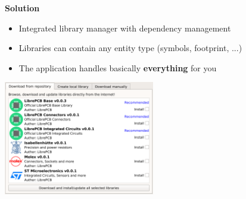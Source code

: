 \begin{frame}[noframenumbering]{\secname}
\begin{center}
  \end{center}
\end{frame}

\begin{frame}[noframenumbering]{\secname}
  \textbf{Solution}
  \begin{itemize}
    \item Integrated library manager with dependency management
    \item Libraries can contain any entity type (symbols, footprint, ...)
    \item The application handles basically \textbf{everything} for you
  \end{itemize}

  \begin{center}
    \includegraphics[height=5cm]{images/library_manager.png}
  \end{center}
\end{frame}